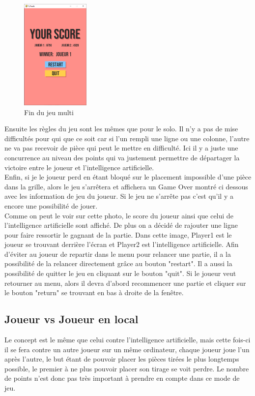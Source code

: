 \documentclass[a4paper]{report}
\begin{document}
\begin{figure}
    \centering
    \includegraphics[width=0.3\textwidth, trim=0pt 0pt 0pt 30pt]{images/4-endmulti.png}
    \caption{Fin du jeu multi}
\end{figure}
Ensuite les règles du jeu sont les mêmes que pour le solo. Il n'y a pas de mise difficultés pour qui que ce soit car si l'un rempli une ligne ou une colonne, l'autre ne va pas recevoir de pièce qui peut le mettre en difficulté. Ici il y a juste une concurrence au niveau des points qui va justement permettre de départager la victoire entre le joueur et l'intelligence artificielle.\\

Enfin, si je le joueur perd en étant bloqué sur le placement impossible d'une pièce dans la grille, alors le jeu s'arrêtera et affichera un Game Over montré ci dessous avec les information de jeu du joueur. Si le jeu ne s'arrête pas c'est qu'il y a encore une possibilité de jouer.  \\

Comme on peut le voir sur cette photo, le score du joueur ainsi que celui de l'intelligence artificielle sont affiché. De plus on a décidé de rajouter une ligne pour faire ressortir le gagnant de la partie. Dans cette image, Player1 est le joueur se trouvant derrière l'écran et Player2 est l'intelligence artificielle. Afin d'éviter au joueur de repartir dans le menu pour relancer une partie, il a la possibilité de la relancer directement grâce au bouton "restart". Il a aussi la possibilité de quitter le jeu en cliquant sur le bouton "quit". Si le joueur veut retourner au menu, alors il devra d'abord recommencer une partie et cliquer sur le bouton "return" se trouvant en bas à droite de la fenêtre. 

\subsection{Joueur vs Joueur en local}
Le concept est le même que celui contre l'intelligence artificielle, mais cette fois-ci il se fera contre un autre joueur sur un même ordinateur, chaque joueur joue l'un après l'autre, le but étant de pouvoir placer les pièces tirées le plus longtemps possible, le premier à ne plus pouvoir placer son tirage se voit perdre. Le nombre de points n'est donc pas très important à prendre en compte dans ce mode de jeu. \\
\end{document}
